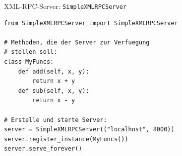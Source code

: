 \begin{frame}[fragile]{XML-RPC-Server: \texttt{SimpleXMLRPCServer}}
\begin{lstlisting}[style=Python]
from SimpleXMLRPCServer import SimpleXMLRPCServer

# Methoden, die der Server zur Verfuegung
# stellen soll:
class MyFuncs:
    def add(self, x, y):
        return x + y
    def sub(self, x, y):
        return x - y
    
# Erstelle und starte Server:
server = SimpleXMLRPCServer(("localhost", 8000))
server.register_instance(MyFuncs())
server.serve_forever()
\end{lstlisting}
\end{frame}



